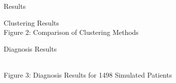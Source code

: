 \documentclass[final]{beamer} %
\begin{document}
\begin{frame}{}
\begin{columns}[T]
\begin{column}{0.3\linewidth}
    \end{column}

    \begin{column}{0.3\linewidth}
    \begin{block}{\Huge Results}
    \begin{block}{\Large Clustering Results }
      \centering
{} \\
   Figure 2: Comparison of Clustering Methods

    \end{block}

    \begin{block}{\Large Diagnosis Results}

\centering
{}
   \\
   Figure 3: Diagnosis Results for 1498 Simulated Patients
      \end{block}
    \end{block}
    \end{column}
    \end{columns}
  \end{frame}
  
\end{document}
